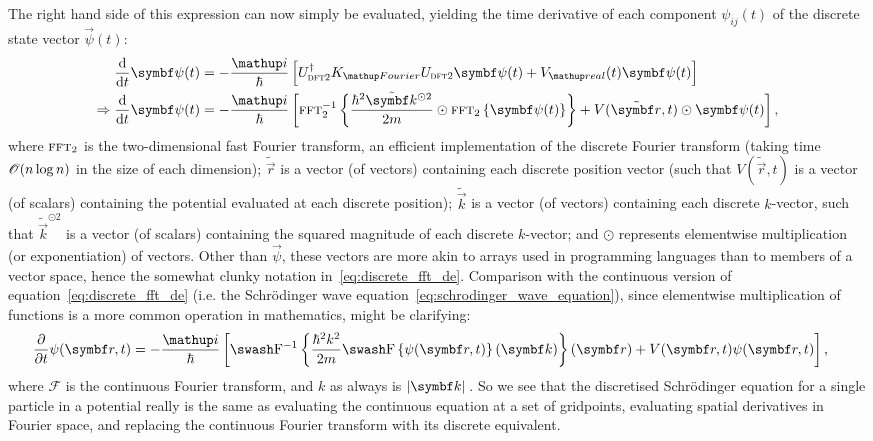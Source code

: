 The right hand side of this expression can now simply be evaluated, yielding the time derivative of each component $\psi_{ij}(t)$ of the discrete state vector $\vec\psi(t)$:
\begin{align}\label{eq:discrete_de_matrices}
\dv{t}\vec\psi(t) &= -\frac{\ii}{\hbar} \left[U^\dagger_{\textsc{dft2}}K_\up{Fourier}U_{\textsc{dft2}}\vec\psi(t) + V_\up{real}(t)\vec\psi(t)\right]\\
\Rightarrow \dv{t}\vec\psi(t) &= -\frac{\ii}{\hbar} \left[
\fft_2^{-1}\left\{\frac{\hbar^2 \tilde{\vec k}^{\odot2}}{2m}\odot\fft_2\left\{\vec\psi(t)\right\}\right\}
+ V(\tilde{\vec r}, t)\odot\vec\psi(t)\right],\label{eq:discrete_fft_de}
\end{align}
where $\operatorname{\textsc{fft}}_2$ is the two-dimensional fast Fourier transform, an efficient implementation of the discrete Fourier transform (taking time $\mathscr{O}(n \log n)$ in the size of each dimension); $\tilde{\vec r}$ is a vector (of vectors) containing each discrete position vector (such that $V(\tilde{\vec r}, t)$ is a vector (of scalars) containing the potential evaluated at each discrete position); $\tilde{\vec k}$ is a vector (of vectors) containing each discrete $k$-vector, such that $\tilde{\vec k}^{\odot2}$ is a vector (of scalars) containing the squared magnitude of each discrete $k$-vector; and 
$\odot$ represents elementwise multiplication (or exponentiation) of vectors. Other than $\vec \psi$, these vectors are more akin to arrays used in programming languages than to members of a vector space, hence the somewhat clunky notation in~\eqref{eq:discrete_fft_de}. Comparison with the continuous version of equation~\eqref{eq:discrete_fft_de} (i.e. the Schr\"odinger wave equation~\eqref{eq:schrodinger_wave_equation}), since elementwise multiplication of functions is a more common operation in mathematics, might be clarifying:
\begin{align}
\pdv{t}\psi(\vec r, t) &= -\frac{\ii}{\hbar} \left[
\mathcal{F}^{-1}\left\{
\frac{\hbar^2 k^2}{2m}\mathcal{F}\left\{\psi(\vec r, t)\right\}(\vec k)
\right\}(\vec r)
+ V(\vec r, t)\psi(\vec r, t)
\right],
\end{align}
where $\mathcal{F}$ is the continuous Fourier transform, and $k$ as always is $\abs{\vec k}$. So we see that the discretised Schr\"odinger equation for a single particle in a potential really is the same as evaluating the continuous equation at a set of gridpoints, evaluating spatial derivatives in Fourier space, and replacing the continuous Fourier transform with its discrete equivalent.

